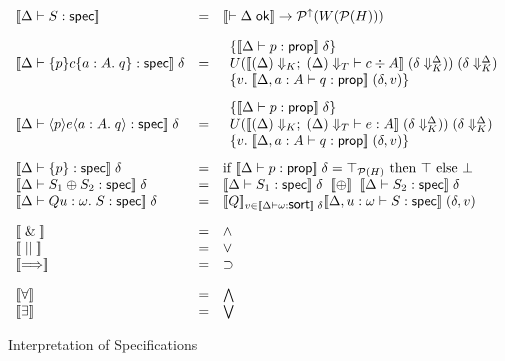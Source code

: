 \begin{figure}
\begin{displaymath}
\begin{array}{lcl}
\interp{\judgeS{S}} & = & \interp{\judgeACtx{\Delta}} \to \upset{W(\powerset{H})} \\ [1em]

\interp{\judgeS{\spec{p}{c}{a:A}{q}}}\;\delta & = & 
   \begin{array}{l}
     \setof{\interp{\judgeA{p}{\assert}}\;\delta} \\
      U(\interp{\judgeC[\restrictkind{\Delta}]{\restricttype{\Delta}}
                       {c}{A}}\;(\restricttyenv{\Delta}{\delta}))\;
       (\restricttyenv{\Delta}{\delta}) \\
     \setof{v.\; \interp{\judgeA[\Delta, a:A]{q}{\assert}}\;(\delta,v)} \\
   \end{array} 
\\[2em]

\interp{\judgeS{\mspec{p}{e}{a:A}{q}}}\;\delta & = & 
   \begin{array}{l}
     \setof{\interp{\judgeA{p}{\assert}}\;\delta} \\
      U(\interp{\judgeE[\restrictkind{\Delta}]{\restricttype{\Delta}}
                       {e}{A}}\;(\restricttyenv{\Delta}{\delta}))\;
       (\restricttyenv{\Delta}{\delta}) \\
     \setof{v.\; \interp{\judgeA[\Delta, a:A]{q}{\assert}}\;(\delta,v)} \\
   \end{array} 
\\[2em]

\interp{\judgeS{\setof{p}}}\;\delta & = & 
  \mbox{if } \interp{\judgeA{p}{\assert}}\;\delta = \top_{\powerset{H}}
  \mbox{ then } \top 
  \mbox{ else } \bot \\

\interp{\judgeS{S_1 \oplus S_2}}\;\delta & = & 
  \interp{\judgeS{S_1}}\;\delta \;\;\interp{\oplus}\;\; 
  \interp{\judgeS{S_2}}\;\delta \\

\interp{\judgeS{Q u:\omega.\; S}}\;\delta & = & 
  \interp{Q}_{v \in \interp{\judgeSort{\omega}}\;\delta} 
     \interp{\judgeS[\Delta, u:\omega]{S}}\;(\delta, v) \\[1em]

\interp{\specand} & = & \land \\
\interp{\specor}  & = & \vee  \\
\interp{\specimp} & = & \implies \\[1em]

\interp{\forall} & = & \bigwedge \\
\interp{\exists} & = & \bigvee \\

\end{array}
\end{displaymath}
\caption{Interpretation of Specifications}
\label{spec-interpretation}  
\end{figure}


